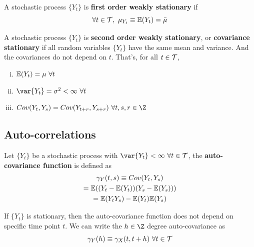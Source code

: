 \documentclass[11pt]{article}
\begin{document}
		\begin{definition}
			A stochastic process $\{Y_t\}$ is \textbf{first order weakly stationary} if
			\begin{equation}
				\forall t \in \mathcal{{T}},\ \mu_{Y_t} \equiv \mathbb{E}({Y_t}) = \bar{\mu}
			\end{equation}
		\end{definition}
		
		\begin{definition}
			A stochastic process $\{Y_t\}$ is \textbf{second order weakly stationary}, or \textbf{covariance stationary} if all random variables $\{Y_t\}$ have the same mean and variance. And the covariances do not depend on $t$.
			That's, for all $t \in \mathcal{{T}}$,
			\begin{enumerate}[(i)]
				\item $\mathbb{E}({Y_t}) = \mu\ \forall t$
				\item $\var{Y_t} = \sigma^2 < \infty\ \forall t$
				\item $Cov(Y_t, Y_s) = Cov(Y_{t+r}, Y_{s+r})\ \forall t,s,r\in \Z$
			\end{enumerate}
		\end{definition}
		
		\subsection{Auto-correlations}
		
		\begin{definition}
			Let $\{Y_t\}$ be a stochastic process with $\var{Y_t} < \infty\ \forall t \in \mc{T}$, the \textbf{auto-covariance function} is defined as
			\begin{gather}
				\gamma_Y(t, s) \equiv Cov(Y_t, Y_s) \\
				= \mathbb{E}({(Y_t - \mathbb{E}({Y_t}))(Y_s - \mathbb{E}({Y_s}))}) \\
				= \mathbb{E}({Y_t Y_s}) - \mathbb{E}({Y_t}) \mathbb{E}({Y_s})
			\end{gather}
		\end{definition}
		
		\begin{lemma}
			If $\{Y_t\}$ is stationary, then the auto-covariance function does not depend on specific time point $t$. We can write the $h \in \Z$ degree auto-covariance as 
			\begin{equation}
				\gamma_Y(h) \equiv \gamma_X(t, t+h)\ \forall t \in \mathcal{{T}}
			\end{equation}
		\end{lemma}
	
\end{document}
